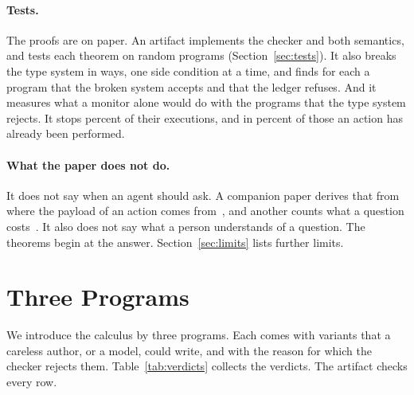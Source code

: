 \documentclass[acmsmall,nonacm,screen]{acmart}
\begin{document}
\paragraph{Tests.} The proofs are on paper. An artifact implements the checker and both
semantics, and tests each theorem on random programs
(Section~\ref{sec:tests}). It also breaks the type system in \exRules{} ways, one side
condition at a time, and finds for each a program that the broken system accepts and that the
ledger refuses. And it measures what a monitor alone would do with the programs that the type
system rejects. It stops \exStoppedPercent{} percent of their executions, and in
\exLatePercent{} percent of those an action has already been performed.

\paragraph{What the paper does not do.} It does not say when an agent should ask. A companion
paper derives that from where the payload of an action comes from~\citep{tpp7}, and another
counts what a question costs~\citep{tpp6}. It also does not say what a person understands of a
question. The theorems begin at the answer. Section~\ref{sec:limits} lists further limits.

\section{Three Programs}
\label{sec:overview}

We introduce the calculus by three programs. Each comes with variants that a careless author,
or a model, could write, and with the reason for which the checker rejects them.
Table~\ref{tab:verdicts} collects the verdicts. The artifact checks every row.
\end{document}
